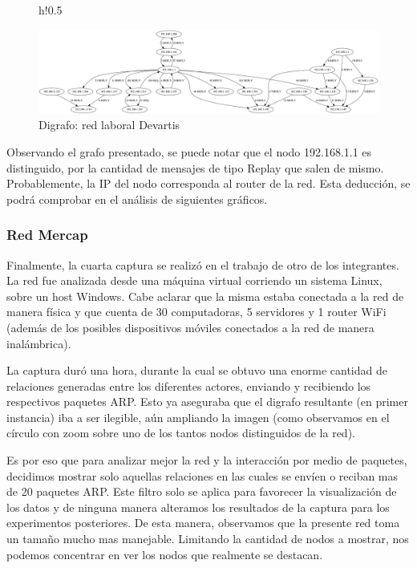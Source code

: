 \begin{figure}{h!}{0.5\textwidth}
  \begin{center}
    \includegraphics[angle=90, scale=0.3]{./graficos/grafos-arp/grafo_laburo_mari.png}
  \end{center}
  \caption{Digrafo: red laboral Devartis}
\end{figure}

Observando el grafo presentado, se puede notar que el nodo 192.168.1.1 es distinguido, por la cantidad de mensajes de tipo Replay que salen de mismo. Probablemente, la IP del nodo corresponda al router de la red. Esta  deducción, se podrá comprobar en el análisis de siguientes gráficos.

\subsubsection{Red Mercap}
Finalmente, la cuarta captura se realizó en el trabajo de otro de los integrantes. La red fue analizada desde una máquina virtual corriendo un sistema Linux, sobre un host Windows. Cabe aclarar que la misma estaba conectada a la red de manera física y que cuenta de 30 computadoras, 5 servidores y 1 router WiFi (además de los posibles dispositivos móviles conectados a la red de manera inalámbrica).

La captura duró una hora, durante la cual se obtuvo una enorme cantidad de relaciones generadas entre los diferentes actores, enviando y recibiendo los respectivos paquetes ARP. Esto ya aseguraba que el digrafo resultante (en primer instancia) iba a ser ilegible, aún ampliando la imagen (como observamos en el círculo con zoom sobre uno de los tantos nodos distinguidos de la red). 

Es por eso que para analizar mejor la red y la interacción por medio de paquetes, decidimos mostrar solo aquellas relaciones en las cuales se envíen o reciban mas de 20 paquetes ARP. Este filtro solo se aplica para favorecer la visualización de los datos y de ninguna manera alteramos los resultados de la captura para los experimentos posteriores. De esta manera, observamos que la presente red toma un tamaño mucho mas manejable. Limitando la cantidad de nodos a mostrar, nos podemos concentrar en ver los nodos que realmente se destacan.

